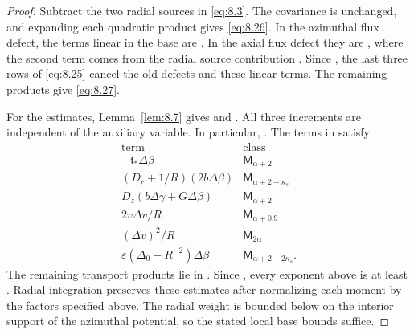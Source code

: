 \begin{proof}
Subtract the two radial sources in \eqref{eq:8.3}. The covariance
 is unchanged, and expanding each quadratic product gives
\eqref{eq:8.26}. In the azimuthal flux defect, the terms linear in the base are
. In the axial flux defect they are
, where the second term comes from
the radial source contribution
. Since
, the last three rows of \eqref{eq:8.25} cancel the old
defects and these linear terms. The remaining products give \eqref{eq:8.27}.

For the estimates, Lemma~\ref{lem:8.7} gives
 and
. All three increments are independent of the
auxiliary variable. In particular,
. The terms in
 satisfy
\[
\begin{array}{c|c}
\text{term}&\text{class}\\ \hline
-\mathfrak t_*\Delta\beta&\mathsf M_{\alpha+2}\\
(D_r+1/R)(2b\Delta\beta)&\mathsf M_{\alpha+2-\kappa_s}\\
D_z(b\Delta\gamma+G\Delta\beta)&\mathsf M_{\alpha+2}\\
2v\Delta v/R&\mathsf M_{\alpha+0.9}\\
(\Delta v)^2/R&\mathsf M_{2\alpha}\\
\varepsilon(\Delta_0-R^{-2})\Delta\beta&\mathsf M_{\alpha+2-2\kappa_s}.
\end{array}
\]
The remaining transport products lie in . Since
, every exponent above is at least
. Radial integration preserves these estimates after
normalizing each moment by the factors specified above. The radial weight is bounded below on the
interior support of the azimuthal potential, so the stated local base bounds suffice.
\end{proof}

